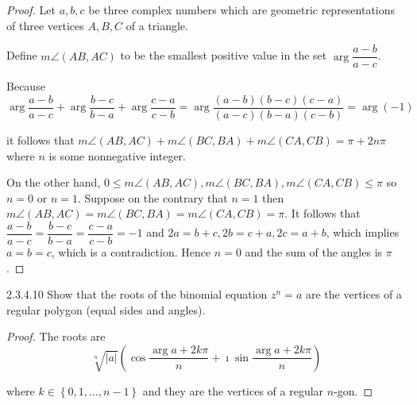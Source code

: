 \begin{proof}
	Let \( a, b, c \) be three complex numbers which are geometric representations of three vertices \(A, B, C \) of a triangle.

	Define \( m\angle (AB, AC) \) to be the smallest positive value in the set \( \arg\dfrac{a - b}{a - c} \).

	Because
	\[
		\arg\dfrac{a - b}{a - c} + \arg\dfrac{b - c}{b - a} + \arg\dfrac{c - a}{c - b} = \arg \dfrac{(a - b)(b - c)(c - a)}{(a - c)(b - a)(c - b)} = \arg (-1)
	\]

	it follows that \( m\angle (AB, AC) + m\angle(BC, BA) + m\angle(CA, CB) = \pi + 2n\pi \) where \( n \) is some nonnegative integer.

	On the other hand, \( 0 \le m\angle (AB, AC), m\angle(BC, BA), m\angle(CA, CB) \le \pi \) so \( n = 0 \) or \( n = 1 \). Suppose on the contrary that \( n = 1 \) then \( m\angle (AB, AC) = m\angle(BC, BA) = m\angle(CA, CB) = \pi \). It follows that \( \dfrac{a - b}{a - c} = \dfrac{b - c}{b - a} = \dfrac{c - a}{c - b} = -1 \) and \( 2a = b + c, 2b = c + a, 2c = a + b \), which implies \( a = b = c \), which is a contradiction. Hence \( n = 0 \) and the sum of the angles is \( \pi \).
\end{proof}

\begin{problem}{2.3.4.10}
Show that the roots of the binomial equation \( z^{n} = a \) are the vertices of a regular polygon (equal sides and angles).
\end{problem}

\begin{proof}
	The roots are
	\[
		\sqrt[n]{\left\vert a \right\vert}\left(\cos\dfrac{\arg a + 2k\pi}{n} + \imath\sin\dfrac{\arg a + 2k\pi}{n}\right)
	\]

	where \( k \in \left\{ 0, 1, \ldots, n - 1 \right\} \) and they are the vertices of a regular \( n \)-gon.
\end{proof}
